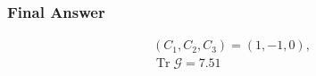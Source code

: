 \subsubsection*{Final Answer}

\[
\boxed{
\begin{gathered}
(C_1,C_2,C_3)=(1,-1,0),\\
\operatorname{Tr}\mathcal{G}=7.51
\end{gathered}
}
\]
